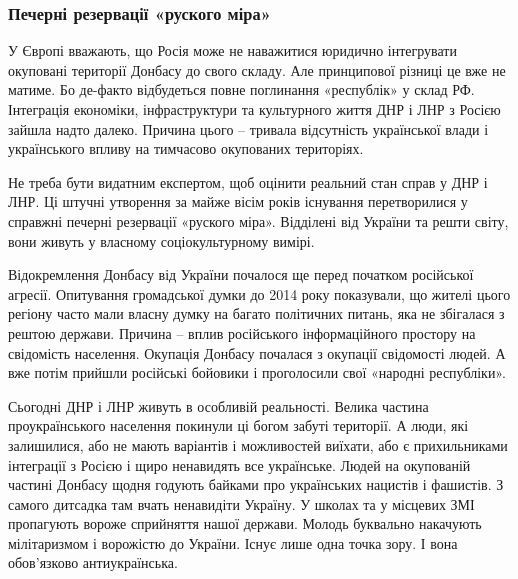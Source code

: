  
 
 
 
 

\subsubsection{Печерні резервації «руского міра»}
\label{sec:21_01_2022.stz.news.ua.fromua.1.lnr_dnr_marionetki.2.rezervacii}

У Європі вважають, що Росія може не наважитися юридично інтегрувати окуповані
території Донбасу до свого складу. Але принципової різниці це вже не матиме. Бо
де-факто відбудеться повне поглинання «республік» у склад РФ. Інтеграція
економіки, інфраструктури та культурного життя ДНР і ЛНР з Росією зайшла надто
далеко. Причина цього – тривала відсутність української влади і українського
впливу на тимчасово окупованих територіях.

Не треба бути видатним експертом, щоб оцінити реальний стан справ у ДНР і ЛНР.
Ці штучні утворення за майже вісім років існування перетворилися у справжні
печерні резервації «руского міра». Відділені від України та решти світу, вони
живуть у власному соціокультурному вимірі.

Відокремлення Донбасу від України почалося ще перед початком російської
агресії. Опитування громадської думки до 2014 року показували, що жителі цього
регіону часто мали власну думку на багато політичних питань, яка не збігалася з
рештою держави. Причина – вплив російського інформаційного простору на
свідомість населення. Окупація Донбасу почалася з окупації свідомості людей. А
вже потім прийшли російські бойовики і проголосили свої «народні республіки».

Сьогодні ДНР і ЛНР живуть в особливій реальності. Велика частина
проукраїнського населення покинули ці богом забуті території. А люди, які
залишилися, або не мають варіантів і можливостей виїхати, або є прихильниками
інтеграції з Росією і щиро ненавидять все українське. Людей на окупованій
частині Донбасу щодня годують байками про українських нацистів і фашистів. З
самого дитсадка там вчать ненавидіти Україну. У школах та у місцевих ЗМІ
пропагують вороже сприйняття нашої держави. Молодь буквально накачують
мілітаризмом і ворожістю до України. Існує лише одна точка зору. І вона
обов’язково антиукраїнська.


